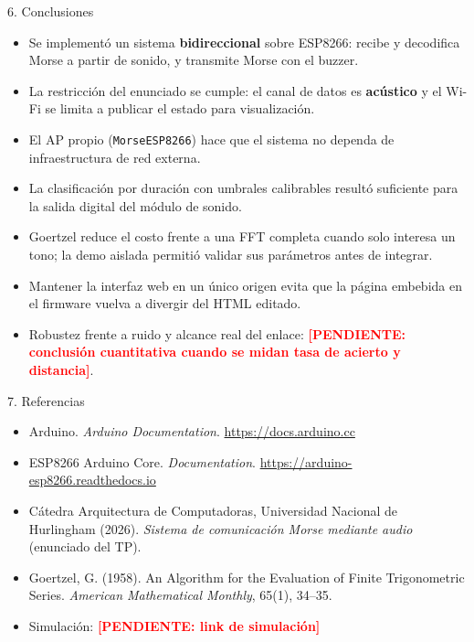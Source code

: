 \documentclass[final]{beamer}
\newlength{\onecolwid}
\newcommand{\pendiente}[1]{\textcolor{red}{\textbf{[PENDIENTE: #1]}}}
\begin{document}
\begin{frame}[t]
\begin{columns}[t]
\begin{column}{\onecolwid}
\begin{block}{6. Conclusiones}
\begin{itemize}
\item Se implementó un sistema \textbf{bidireccional} sobre ESP8266: recibe y decodifica Morse a partir de sonido, y transmite Morse con el buzzer.
\item La restricción del enunciado se cumple: el canal de datos es \textbf{acústico} y el Wi-Fi se limita a publicar el estado para visualización.
\item El AP propio (\texttt{MorseESP8266}) hace que el sistema no dependa de infraestructura de red externa.
\item La clasificación por duración con umbrales calibrables resultó suficiente para la salida digital del módulo de sonido.
\item Goertzel reduce el costo frente a una FFT completa cuando solo interesa un tono; la demo aislada permitió validar sus parámetros antes de integrar.
\item Mantener la interfaz web en un único origen evita que la página embebida en el firmware vuelva a divergir del HTML editado.
\item Robustez frente a ruido y alcance real del enlace: \pendiente{conclusión cuantitativa cuando se midan tasa de acierto y distancia}.
\end{itemize}

\end{block}

\begin{block}{7. Referencias}

\begin{itemize}
\item Arduino. \emph{Arduino Documentation}. \url{https://docs.arduino.cc}
\item ESP8266 Arduino Core. \emph{Documentation}. \url{https://arduino-esp8266.readthedocs.io}
\item Cátedra Arquitectura de Computadoras, Universidad Nacional de Hurlingham (2026). \emph{Sistema de comunicación Morse mediante audio} (enunciado del TP).
\item Goertzel, G. (1958). An Algorithm for the Evaluation of Finite Trigonometric Series. \emph{American Mathematical Monthly}, 65(1), 34--35.
\item Simulación: \pendiente{link de simulación}
\end{itemize}


\end{block}
\end{column}
\end{columns}
\end{frame}
\end{document}
